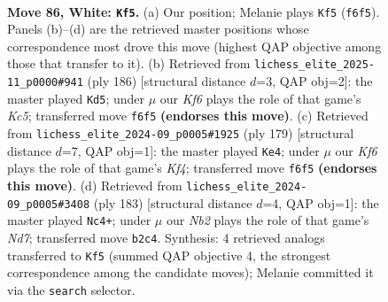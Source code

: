 \documentclass[11pt]{article}
\begin{document}
\clearpage

\begin{figure}[p]\centering
\begin{subfigure}{0.46\textwidth}\centering
\resizebox{\linewidth}{!}{%
\newchessgame
\chessboard[
  setfen={1R6/8/5K2/k7/3r4/8/1N4P1/8 w - - 36 86},
  showmover=false,
  pgfstyle=straightmove, color=movearrow, markmove={f6-f5}
]}
\caption{}
\end{subfigure}\hfill
\begin{subfigure}{0.46\textwidth}\centering
\resizebox{\linewidth}{!}{%
\newchessgame
\chessboard[
  setfen={N3R3/8/8/2K5/8/3k4/8/1r6 w - - 29 94},
  showmover=false,
  pgfstyle=straightmove, color=movearrow, markmove={c5-d5}
]}
\caption{}
\end{subfigure}
\\[4pt]
\begin{subfigure}{0.46\textwidth}\centering
\resizebox{\linewidth}{!}{%
\newchessgame
\chessboard[
  setfen={8/8/8/4nk2/8/6R1/r7/3K4 b - - 67 90},
  showmover=false,
  pgfstyle=straightmove, color=movearrow, markmove={f5-e4}
]}
\caption{}
\end{subfigure}\hfill
\begin{subfigure}{0.46\textwidth}\centering
\resizebox{\linewidth}{!}{%
\newchessgame
\chessboard[
  setfen={8/2R5/8/8/3k4/8/K2n3r/8 b - - 85 92},
  showmover=false,
  pgfstyle=straightmove, color=movearrow, markmove={d2-c4}
]}
\caption{}
\end{subfigure}
\caption{\textbf{Move 86, White: \texttt{Kf5}.} (a) Our position; Melanie plays \texttt{Kf5} (\texttt{f6f5}). Panels (b)--(d) are the retrieved master positions whose correspondence most drove this move (highest QAP objective among those that transfer to it). (b) Retrieved from \texttt{lichess\_elite\_2025-11\_p0000\#941} (ply 186) [structural distance $d$=3, QAP obj=2]: the master played \texttt{Kd5}; under $\mu$ our \emph{Kf6} plays the role of that game's \emph{Kc5}; transferred move \texttt{f6f5} \textbf{(endorses this move)}. (c) Retrieved from \texttt{lichess\_elite\_2024-09\_p0005\#1925} (ply 179) [structural distance $d$=7, QAP obj=1]: the master played \texttt{Ke4}; under $\mu$ our \emph{Kf6} plays the role of that game's \emph{Kf4}; transferred move \texttt{f6f5} \textbf{(endorses this move)}. (d) Retrieved from \texttt{lichess\_elite\_2024-09\_p0005\#3408} (ply 183) [structural distance $d$=4, QAP obj=1]: the master played \texttt{Nc4+}; under $\mu$ our \emph{Nb2} plays the role of that game's \emph{Nd7}; transferred move \texttt{b2c4}. Synthesis: 4 retrieved analogs transferred to \texttt{Kf5} (summed QAP objective 4, the strongest correspondence among the candidate moves); Melanie committed it via the \texttt{search} selector.}
\label{fig:thought-m170}
\end{figure}
\end{document}
